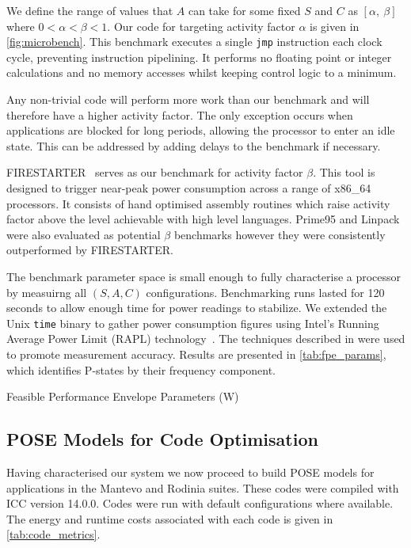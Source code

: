 We define the range of values that $A$ can take for some fixed $S$ and $C$ as $[\alpha,~\beta]$ where $0 < \alpha < \beta < 1$.
Our code for targeting activity factor $\alpha$ is given in \autoref{fig:microbench}.
This benchmark executes a single \texttt{jmp} instruction each clock cycle, preventing instruction pipelining.
It performs no floating point or integer calculations and no memory accesses whilst keeping control logic to a minimum.

Any non-trivial code will perform more work than our benchmark and will therefore have a higher activity factor.
The only exception occurs when applications are blocked for long periods, allowing the processor to enter an idle state.
This can be addressed by adding delays to the benchmark if necessary.

FIRESTARTER~\cite{hackenberg:2013ab} serves as our benchmark for activity factor $\beta$.
This tool is designed to trigger near-peak power consumption across a range of x86\_64 processors.
It consists of hand optimised assembly routines which raise activity factor above the level achievable with high level languages.
Prime95 and Linpack were also evaluated as potential $\beta$ benchmarks however they were consistently outperformed by FIRESTARTER.

The benchmark parameter space is small enough to fully characterise a processor by measuirng all $(S,A,C)$ configurations.
Benchmarking runs lasted for 120 seconds to allow enough time for power readings to stabilize.
We extended the Unix \texttt{time} binary to gather power consumption figures using Intel's Running Average Power Limit (RAPL) technology~\cite{david:2010aa}.
The techniques described in \cite{hahnel:2012aa} were used to promote measurement accuracy.
Results are presented in \autoref{tab:fpe_params}, which identifies P-states by their frequency component.

\begin{table}
\centering
\caption{Feasible Performance Envelope Parameters (W)}
\label{tab:fpe_params}

\end{table}

\subsection{POSE Models for Code Optimisation}
Having characterised our system we now proceed to build POSE models for applications in the Mantevo and Rodinia suites.
These codes were compiled with ICC version 14.0.0.
Codes were run with default configurations where available.
The energy and runtime costs associated with each code is given in \autoref{tab:code_metrics}.

